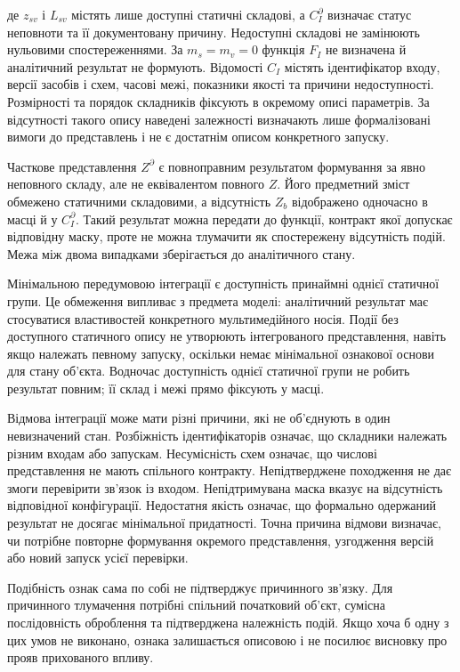 де $z_{sv}$ і $L_{sv}$ містять лише доступні статичні складові, а $C_I^{\partial}$ визначає статус неповноти та її документовану причину. Недоступні складові не замінюють нульовими спостереженнями. За $m_s=m_v=0$ функція $F_I$ не визначена й аналітичний результат не формують. Відомості $C_I$ містять ідентифікатор входу, версії засобів і схем, часові межі, показники якості та причини недоступності. Розмірності та порядок складників фіксують в окремому описі параметрів. За відсутності такого опису наведені залежності визначають лише формалізовані вимоги до представлень і не є достатнім описом конкретного запуску.

Часткове представлення $Z^{\partial}$ є повноправним результатом формування за явно неповного складу, але не еквівалентом повного $Z$. Його предметний зміст обмежено статичними складовими, а відсутність $Z_b$ відображено одночасно в масці й у $C_I^{\partial}$. Такий результат можна передати до функції, контракт якої допускає відповідну маску, проте не можна тлумачити як спостережену відсутність подій. Межа між двома випадками зберігається до аналітичного стану.

Мінімальною передумовою інтеграції є доступність принаймні однієї статичної групи. Це обмеження випливає з предмета моделі: аналітичний результат має стосуватися властивостей конкретного мультимедійного носія. Події без доступного статичного опису не утворюють інтегрованого представлення, навіть якщо належать певному запуску, оскільки немає мінімальної ознакової основи для стану об’єкта. Водночас доступність однієї статичної групи не робить результат повним; її склад і межі прямо фіксують у масці.

Відмова інтеграції може мати різні причини, які не об’єднують в один невизначений стан. Розбіжність ідентифікаторів означає, що складники належать різним входам або запускам. Несумісність схем означає, що числові представлення не мають спільного контракту. Непідтверджене походження не дає змоги перевірити зв’язок із входом. Непідтримувана маска вказує на відсутність відповідної конфігурації. Недостатня якість означає, що формально одержаний результат не досягає мінімальної придатності. Точна причина відмови визначає, чи потрібне повторне формування окремого представлення, узгодження версій або новий запуск усієї перевірки.

Подібність ознак сама по собі не підтверджує причинного зв’язку. Для причинного тлумачення потрібні спільний початковий об’єкт, сумісна послідовність оброблення та підтверджена належність подій. Якщо хоча б одну з цих умов не виконано, ознака залишається описовою і не посилює висновку про прояв прихованого впливу.

